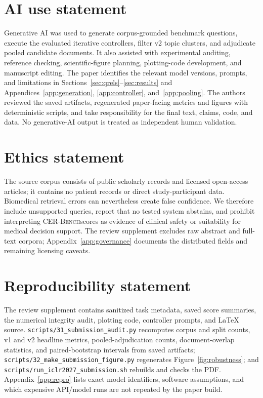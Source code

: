 \documentclass{article}
\newcommand{\cer}{\textsc{CER-Bench}}
\begin{document}
\section*{AI use statement}
Generative AI was used to generate corpus-grounded benchmark questions, execute the evaluated iterative controllers, filter v2 topic clusters, and adjudicate pooled candidate documents. It also assisted with experimental auditing, reference checking, scientific-figure planning, plotting-code development, and manuscript editing. The paper identifies the relevant model versions, prompts, and limitations in Sections~\ref{sec:qrels}--\ref{sec:results} and Appendices~\ref{app:generation}, \ref{app:controller}, and~\ref{app:pooling}. The authors reviewed the saved artifacts, regenerated paper-facing metrics and figures with deterministic scripts, and take responsibility for the final text, claims, code, and data. No generative-AI output is treated as independent human validation.

\section*{Ethics statement}
The source corpus consists of public scholarly records and licensed open-access articles; it contains no patient records or direct study-participant data. Biomedical retrieval errors can nevertheless create false confidence. We therefore include unsupported queries, report that no tested system abstains, and prohibit interpreting \cer scores as evidence of clinical safety or suitability for medical decision support. The review supplement excludes raw abstract and full-text corpora; Appendix~\ref{app:governance} documents the distributed fields and remaining licensing caveats.

\section*{Reproducibility statement}
The review supplement contains sanitized task metadata, saved score summaries, the numerical integrity audit, plotting code, controller prompts, and LaTeX source. \texttt{scripts/31\_submission\_audit.py} recomputes corpus and split counts, v1 and v2 headline metrics, pooled-adjudication counts, document-overlap statistics, and paired-bootstrap intervals from saved artifacts; \texttt{scripts/32\_make\_submission\_figure.py} regenerates Figure~\ref{fig:robustness}; and \texttt{scripts/run\_iclr2027\_submission.sh} rebuilds and checks the PDF. Appendix~\ref{app:repro} lists exact model identifiers, software assumptions, and which expensive API/model runs are not repeated by the paper build.
\end{document}
